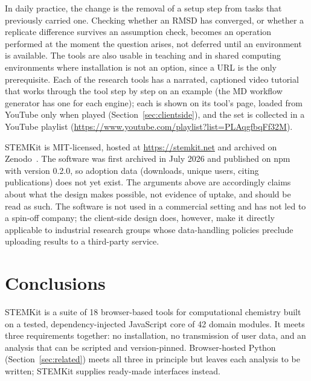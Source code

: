 \documentclass[11pt,a4paper]{article}
\begin{document}
In daily practice, the change is the removal of a setup step from tasks that
previously carried one. Checking whether an RMSD has converged, or whether a
replicate difference survives an assumption check, becomes an operation
performed at the moment the question arises, not deferred until an
environment is available. The tools are also usable in teaching and in shared
computing environments where installation is not an option, since a URL is the
only prerequisite. Each of the research tools has a narrated, captioned video
tutorial that works through the tool step by step on an example (the MD workflow generator has one for each engine); each is shown on its tool's page, loaded from YouTube only when played
(Section~\ref{sec:clientside}), and the set is collected in a
YouTube playlist (\url{https://www.youtube.com/playlist?list=PLAqgfbqFf32M}).

STEMKit is MIT-licensed, hosted at \url{https://stemkit.net} and archived on
Zenodo~\cite{stemkit2026}. The software was first archived in July 2026 and
published on npm with version 0.2.0, so adoption data (downloads, unique users,
citing publications) does not yet exist. The arguments above are accordingly claims about what the design makes
possible, not evidence of uptake, and should be read as such. The software is
not used in a commercial setting and has not led to a spin-off company; the
client-side design does, however, make it directly applicable to industrial
research groups whose data-handling policies preclude uploading results to a
third-party service.

\section{Conclusions}
\label{sec:conclusions}

STEMKit is a suite of 18 browser-based tools for computational chemistry built
on a tested, dependency-injected JavaScript core of 42 domain modules. It meets
three requirements together: no installation, no transmission of user data, and
an analysis that can be scripted and version-pinned. Browser-hosted Python
(Section~\ref{sec:related}) meets all three in principle but leaves each
analysis to be written; STEMKit supplies ready-made interfaces instead.
\end{document}
